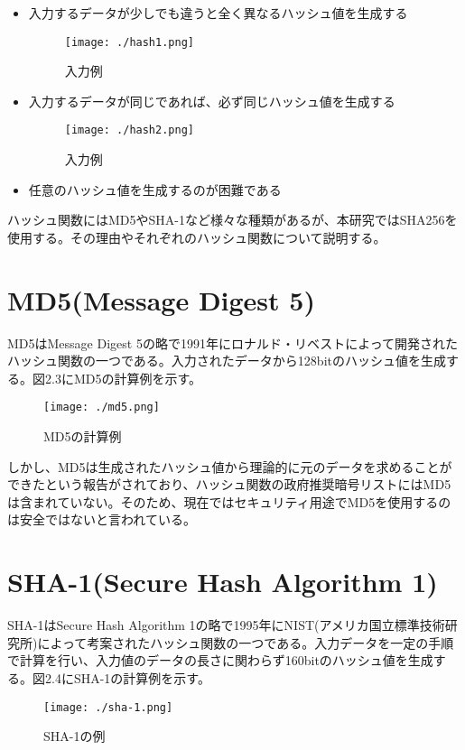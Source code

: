 \documentclass{thesis}
\begin{document}
\begin{itemize}
\item 入力するデータが少しでも違うと全く異なるハッシュ値を生成する

\begin{figure}[H]
 \center
 \texttt{[image: ./hash1.png]}
 \caption{入力例}
\end{figure}

\item 入力するデータが同じであれば、必ず同じハッシュ値を生成する

\begin{figure}[H]
 \center
 \texttt{[image: ./hash2.png]}
 \caption{入力例}
\end{figure}

\item 任意のハッシュ値を生成するのが困難である
\end{itemize}

ハッシュ関数にはMD5やSHA-1など様々な種類があるが、本研究ではSHA256を使用する。その理由やそれぞれのハッシュ関数について説明する。

\section{MD5(Message Digest 5)}
MD5はMessage Digest 5の略で1991年にロナルド・リベストによって開発されたハッシュ関数の一つである\cite{two}。入力されたデータから128bitのハッシュ値を生成する。図2.3にMD5の計算例を示す。

\begin{figure}[H]
 \center
 \texttt{[image: ./md5.png]}
 \caption{MD5の計算例}
\end{figure}

しかし、MD5は生成されたハッシュ値から理論的に元のデータを求めることができたという報告がされており、ハッシュ関数の政府推奨暗号リストにはMD5は含まれていない。そのため、現在ではセキュリティ用途でMD5を使用するのは安全ではないと言われている。

\section{SHA-1(Secure Hash Algorithm 1)}
SHA-1はSecure Hash Algorithm 1の略で1995年にNIST(アメリカ国立標準技術研究所)によって考案されたハッシュ関数の一つである\cite{three}。入力データを一定の手順で計算を行い、入力値のデータの長さに関わらず160bitのハッシュ値を生成する。図2.4にSHA-1の計算例を示す。

\begin{figure}[H]
 \center
 \texttt{[image: ./sha-1.png]}
 \caption{SHA-1の例}
\end{figure}
\end{document}
